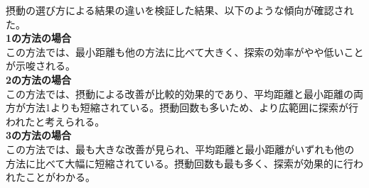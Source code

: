 \documentclass[a4paper,11pt]{ltjsarticle}
\begin{document}
摂動の選び方による結果の違いを検証した結果、以下のような傾向が確認された。\\
{\bf 1の方法の場合}\\
この方法では、最小距離も他の方法に比べて大きく、探索の効率がやや低いことが示唆される。\\
{\bf 2の方法の場合}\\
この方法では、摂動による改善が比較的効果的であり、平均距離と最小距離の両方が方法1よりも短縮されている。摂動回数も多いため、より広範囲に探索が行われたと考えられる。\\
{\bf 3の方法の場合}\\
この方法では、最も大きな改善が見られ、平均距離と最小距離がいずれも他の方法に比べて大幅に短縮されている。摂動回数も最も多く、探索が効果的に行われたことがわかる。\\
\end{document}
